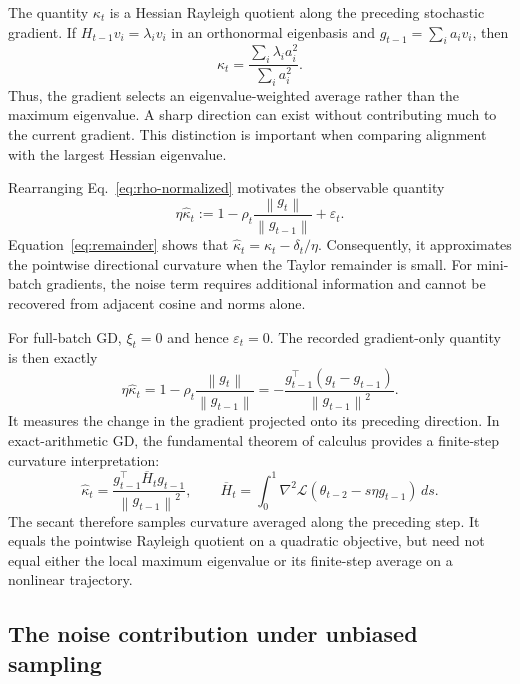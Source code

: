 \documentclass[11pt]{article}
\newcommand{\norm}[1]{\left\lVert#1\right\rVert}
\newcommand{\Loss}{\mathcal{L}}
\begin{document}
The quantity $\kappa_t$ is a Hessian Rayleigh quotient along the preceding
stochastic gradient. If $H_{t-1}v_i=\lambda_i v_i$ in an orthonormal eigenbasis
and $g_{t-1}=\sum_i a_i v_i$, then
\begin{equation}
  \kappa_t=\frac{\sum_i\lambda_i a_i^2}{\sum_i a_i^2}.
  \label{eq:rayleigh}
\end{equation}
Thus, the gradient selects an eigenvalue-weighted average rather than the
maximum eigenvalue. A sharp direction can exist without contributing much to
the current gradient. This distinction is important when comparing alignment
with the largest Hessian eigenvalue.

Rearranging Eq.~\eqref{eq:rho-normalized} motivates the observable quantity
\begin{equation}
  \eta\widehat\kappa_t
  :=1-\rho_t\frac{\norm{g_t}}{\norm{g_{t-1}}}+\varepsilon_t.
  \label{eq:kappa-estimate}
\end{equation}
Equation~\eqref{eq:remainder} shows that
$\widehat\kappa_t=\kappa_t-\delta_t/\eta$. Consequently, it approximates the
pointwise directional curvature when the Taylor remainder is small. For
mini-batch gradients, the noise term requires additional information and cannot
be recovered from adjacent cosine and norms alone.

For full-batch GD, $\xi_t=0$ and hence $\varepsilon_t=0$. The recorded
gradient-only quantity is then exactly
\begin{equation}
\eta\widehat\kappa_t
 =1-\rho_t\frac{\norm{g_t}}{\norm{g_{t-1}}}
 =-\frac{g_{t-1}^\top(g_t-g_{t-1})}{\norm{g_{t-1}}^2}.
\label{eq:gd-proxy}
\end{equation}
It measures the change in the gradient projected onto its preceding direction.
In exact-arithmetic GD, the fundamental theorem of calculus provides a finite-step
curvature interpretation:
\begin{equation}
\widehat\kappa_t=
 \frac{g_{t-1}^\top\overline H_t g_{t-1}}{\norm{g_{t-1}}^2},
\qquad
\overline H_t=\int_0^1\nabla^2\Loss(\theta_{t-2}-s\eta g_{t-1})\,ds.
\label{eq:integrated-hessian}
\end{equation}
The secant therefore samples curvature averaged along the preceding step. It
equals the pointwise Rayleigh quotient on a quadratic objective, but need not
equal either the local maximum eigenvalue or its finite-step average on a
nonlinear trajectory.

\subsection{The noise contribution under unbiased sampling}
\end{document}
